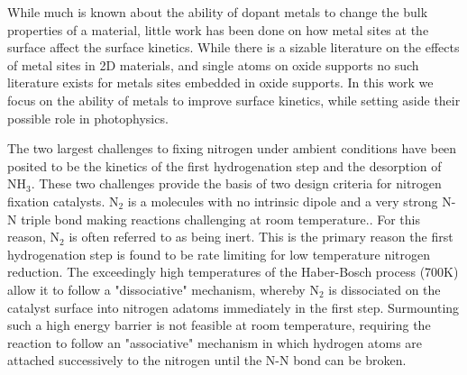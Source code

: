 \documentclass[catalysts,article,submit,moreauthors,pdftex,10pt,a4paper]{mdpi}
\theoremstyle{mdpi}
\newcounter{ex}
\newcounter{re}
\theoremstyle{mdpidefinition}
\begin{document}
While much is known about the ability of dopant metals to change the bulk properties of a material, little work has been done on how metal sites at the surface affect the surface kinetics. While there is a sizable literature on the effects of metal sites in 2D materials\cite{Khan_2018}, and single atoms on oxide supports\cite{Liu_2016} no such literature exists for metals sites embedded in oxide supports. In this work we focus on the ability of metals to improve surface kinetics, while setting aside their possible role in photophysics.



The two largest challenges to fixing nitrogen under ambient conditions have been posited to be the kinetics of the first hydrogenation step and the desorption of NH$_3$.\cite{Hoskuldsson_2017,Singh_2017,Montoya_2015} These two challenges provide the basis of two design criteria for nitrogen fixation catalysts. N$_2$ is a molecules with no intrinsic dipole and a very strong N-N triple bond making reactions challenging at room temperature.\cite{Montoya_2015,Comer_2018}. For this reason, N$_2$ is often referred to as being inert. This is the primary reason the first hydrogenation step is found to be rate limiting for low temperature nitrogen reduction.\cite{Montoya_2015, Singh_2017, Hoskuldsson_2017, Comer_2018} The exceedingly high temperatures of the Haber-Bosch process (700K) allow it to follow a "dissociative" mechanism, whereby N$_2$ is dissociated on the catalyst surface into nitrogen adatoms immediately in the first step.\cite{Ullmann_amm_2006, Hellman_2006} Surmounting such a high energy barrier is not feasible at room temperature, requiring the reaction to follow an "associative" mechanism in which hydrogen atoms are attached successively to the nitrogen until the N-N bond can be broken.\cite{Montoya_2015}
\end{document}
